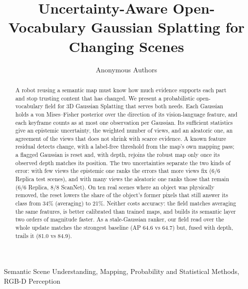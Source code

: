 \documentclass[journal]{IEEEtran}
\title{Uncertainty-Aware Open-Vocabulary Gaussian Splatting for Changing Scenes}
\author{Anonymous Authors}
\begin{document}

\maketitle

\begin{abstract}
A robot reusing a semantic map must know how much evidence supports each part and stop trusting content that has changed. We present a probabilistic open-vocabulary field for 3D Gaussian Splatting that serves both needs. Each Gaussian holds a von Mises--Fisher posterior over the direction of its vision-language feature, and each keyframe counts as at most one observation per Gaussian. Its sufficient statistics give an epistemic uncertainty, the weighted number of views, and an aleatoric one, an agreement of the views that does not shrink with scarce evidence. A known feature residual detects change, with a label-free threshold from the map's own mapping pass; a flagged Gaussian is reset and, with depth, rejoins the robust map only once its observed depth matches its position. The two uncertainties separate the two kinds of error: with few views the epistemic one ranks the errors that more views fix (6/6 Replica test scenes), and with many views the aleatoric one ranks those that remain (6/6 Replica, 8/8 ScanNet). On ten real scenes where an object was physically removed, the reset lowers the share of the object's former pixels that still answer its class from 34\% (averaging) to 21\%. Neither costs accuracy: the field matches averaging the same features, is better calibrated than trained maps, and builds its semantic layer two orders of magnitude faster. As a stale-Gaussian ranker, our field read over the whole update matches the strongest baseline (AP 64.6 vs 64.7) but, fused with depth, trails it (81.0 vs 84.9).
\end{abstract}

\begin{IEEEkeywords}
Semantic Scene Understanding, Mapping, Probability and Statistical Methods, RGB-D Perception
\end{IEEEkeywords}
\end{document}
